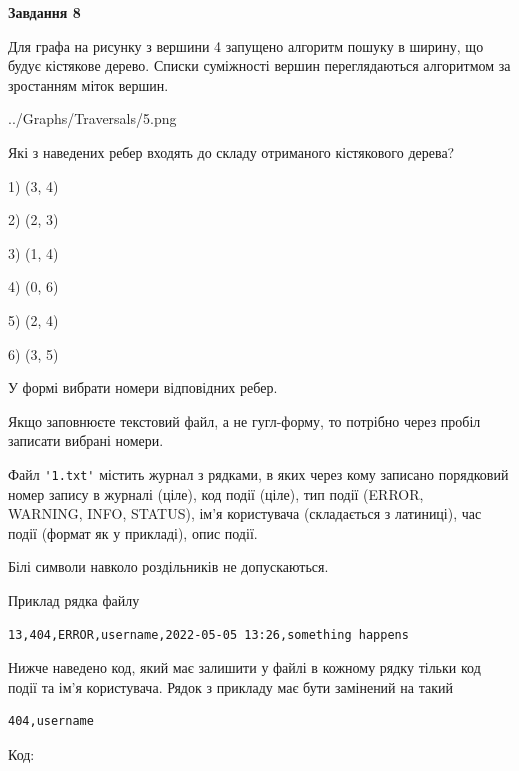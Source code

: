\documentclass[12pt, ukrainian]{article}
\def\code#1{\Verb!#1!}
\begin{document}
{\begin {large}
{\begin {center}\textbf{Завдання 8}\end {center}}\par
Для графа на рисунку з вершини 4 запущено алгоритм пошуку в ширину, що будує кістякове дерево. Списки суміжності вершин переглядаються алгоритмом за зростанням міток вершин.\par
\begin{center}
	{../Graphs/Traversals/5.png}
\end{center}
\par Які з наведених ребер входять до складу отриманого кістякового дерева?\par
1) (3, 4)\par
2) (2, 3)\par
3) (1, 4)\par
4) (0, 6)\par
5) (2, 4)\par
6) (3, 5)\par
{\vskip 15pt} У формі вибрати номери відповідних ребер.


Якщо заповнюєте текстовий файл, а не гугл-форму, то потрібно через пробіл записа\-ти вибрані номери.\par
\newpage


Файл \code{'1.txt'} містить журнал з рядками, в яких через кому записано поряд\-ко\-вий номер запису в журналі (ціле), код події (ціле), тип події (ERROR, \\WARNING, INFO, STATUS), ім'я користувача (складається з латиниці), час події (фор\-мат як у прикладі), опис події.

Білі символи навколо роздільників не допускаються.

Приклад рядка файлу



\begin{verbatim}
13,404,ERROR,username,2022-05-05 13:26,something happens
\end{verbatim}


Нижче наведено код, який має залишити у файлі в кожному рядку тільки код події та ім'я користувача. Рядок з прикладу має бути замінений на такий



\begin{verbatim}
404,username
\end{verbatim}




Код:




\end{large}}
\end{document}
